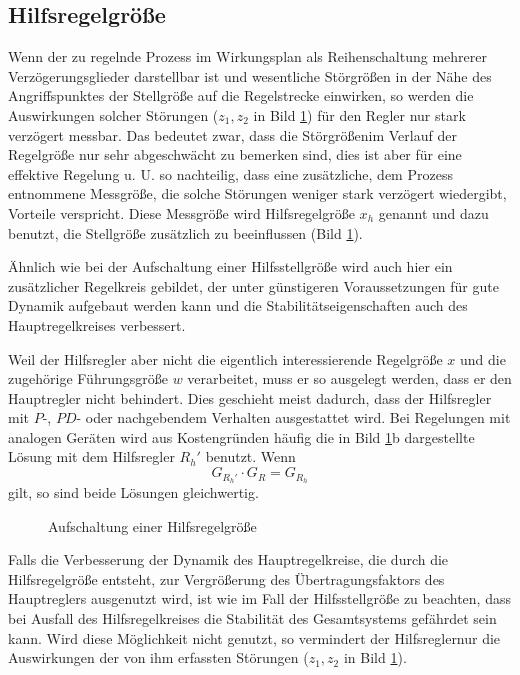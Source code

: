 \subsection{Hilfsregelgröße}

Wenn der zu regelnde Prozess im Wirkungsplan als Reihenschaltung mehrerer Verzögerungsglieder darstellbar ist und wesentliche Störgrößen in der Nähe des Angriffspunktes der Stellgröße auf die Regelstrecke einwirken, so werden die Auswirkungen solcher Störungen (\(z_1, z_2\) in Bild \ref{fig:7-7}) für den Regler nur stark verzögert messbar.
Das bedeutet zwar, dass die Störgrößenim Verlauf der Regelgröße nur sehr abgeschwächt zu bemerken sind, dies ist aber für eine effektive Regelung u. U. so nachteilig, dass eine zusätzliche, dem Prozess entnommene Messgröße, die solche Störungen weniger stark verzögert wiedergibt, Vorteile verspricht.
Diese Messgröße wird Hilfsregelgröße \(x_h\) genannt und dazu benutzt, die Stellgröße zusätzlich zu beeinflussen (Bild \ref{fig:7-7}).

Ähnlich wie bei der Aufschaltung einer Hilfsstellgröße wird auch hier ein zusätzlicher Regelkreis gebildet, der unter günstigeren Voraussetzungen für gute Dynamik aufgebaut werden kann und die Stabilitätseigenschaften auch des Hauptregelkreises verbessert.

Weil der Hilfsregler aber nicht die eigentlich interessierende Regelgröße \(x\) und die zugehörige Führungsgröße \(w\) verarbeitet, muss er so ausgelegt werden, dass er den Hauptregler nicht behindert.
Dies geschieht meist dadurch, dass der Hilfsregler mit \(P\)-, \(PD\)- oder nachgebendem Verhalten ausgestattet wird.
Bei Regelungen mit analogen Geräten wird aus Kostengründen häufig die in Bild \ref{fig:7-7}b dargestellte Lösung mit dem Hilfsregler \(R_h'\) benutzt.
Wenn
\begin{equation}
    G_{R_h'} \cdot G_R = G_{R_h}
\end{equation}
gilt, so sind beide Lösungen gleichwertig.

\begin{figure}[ht]
    \centering
    \caption{Aufschaltung einer Hilfsregelgröße}
    \label{fig:7-7}
\end{figure}

Falls die Verbesserung der Dynamik des Hauptregelkreise, die durch die Hilfsregelgröße entsteht, zur Vergrößerung des Übertragungsfaktors des Hauptreglers ausgenutzt wird, ist wie im Fall der Hilfsstellgröße zu beachten, dass bei Ausfall des Hilfsregelkreises die Stabilität des Gesamtsystems gefährdet sein kann.
Wird diese Möglichkeit nicht genutzt, so vermindert der Hilfsreglernur die Auswirkungen der von ihm erfassten Störungen (\(z_1, z_2\) in Bild \ref{fig:7-7}).

